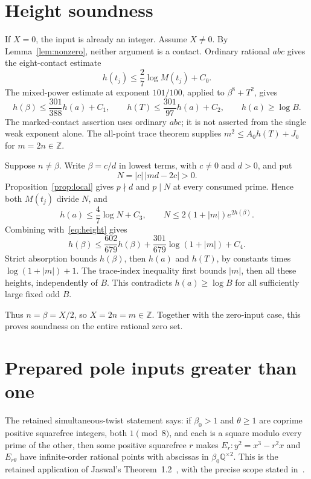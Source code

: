 \documentclass[11pt,a4paper]{article}
\newcommand{\Q}{\mathbb Q}\newcommand{\Z}{\mathbb Z}
\begin{document}
\section{Height soundness}
If $X=0$, the input is already an integer. Assume $X\ne0$.
By Lemma~\ref{lem:nonzero}, neither argument is a contact.
Ordinary rational $abc$ gives the eight-contact estimate
\cite[Section~2]{Height}
\[
                 h(t_j)\le\frac27\log M(t_j)+C_0.
\]
The mixed-power estimate at exponent $101/100$, applied to
$\beta^8+T^2$, gives
\begin{equation}\label{eq:height}
 h(\beta)\le\frac{301}{388}h(a)+C_1,\qquad
 h(T)\le\frac{301}{97}h(a)+C_2,\qquad h(a)\ge\log B.
\end{equation}
The marked-contact assertion uses ordinary $abc$; it is not asserted
from the single weak exponent alone. The all-point trace theorem
\cite[Corollary~1.3]{Trace}
supplies $m^2\le A_0h(T)+J_0$ for $m=2n\in\Z$.

Suppose $n\ne\beta$. Write $\beta=c/d$ in lowest terms,
with $c\ne0$ and $d>0$, and put
\[
                         N=|c|\,|md-2c|>0.
\]
Proposition~\ref{prop:local} gives $p\nmid d$ and $p\mid N$ at
every consumed prime. Hence both $M(t_j)$ divide $N$, and
\[
 h(a)\le\frac47\log N+C_3,\qquad
 N\le2(1+|m|)e^{2h(\beta)}.
\]
Combining with~\eqref{eq:height} gives
\[
 h(\beta)\le\frac{602}{679}h(\beta)
       +\frac{301}{679}\log(1+|m|)+C_4.
\]
Strict absorption bounds $h(\beta)$, then $h(a)$ and $h(T)$,
by constants times $\log(1+|m|)+1$. The trace-index inequality
first bounds $|m|$, then all these heights, independently of $B$.
This contradicts $h(a)\ge\log B$ for all sufficiently large fixed
odd $B$.

Thus $n=\beta=X/2$, so $X=2n=m\in\Z$. Together with the
zero-input case, this proves soundness on the entire rational zero set.

\section{Prepared pole inputs greater than one}\label{sec:pole}
The retained simultaneous-twist statement says: if $\beta_0>1$
and $\theta\ge1$ are coprime positive squarefree integers, both
$1\pmod8$, and each is a square modulo every prime of the other,
then some positive squarefree $r$ makes
$E_r:y^2=x^3-r^2x$ and $E_{r\theta}$ have infinite-order rational
points with abscissas in $\beta_0\Q^{\times2}$.
This is the retained application of Jaswal's
Theorem~1.2~\cite{Jaswal}, with the precise scope stated in~\cite{Pole}.
\end{document}
